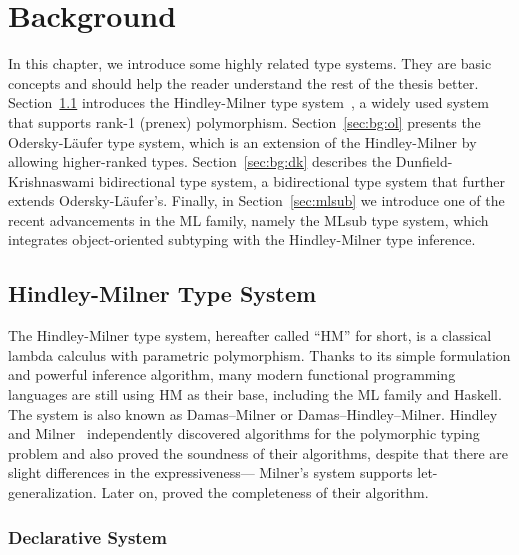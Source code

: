 \chapter{Background}
\label{chap:Background}

In this chapter, we introduce some highly related type systems.
They are basic concepts and should help the reader
understand the rest of the thesis better.
Section~\ref{sec:bg:hm} introduces the
Hindley-Milner type system~\citep{hindley1969principal,
milner1978theory,damas1982principal},
a widely used system that supports rank-1 (prenex) polymorphism.
Section~\ref{sec:bg:ol} presents the Odersky-L\"aufer type system,
which is an extension of the Hindley-Milner by allowing higher-ranked types.
Section~\ref{sec:bg:dk} describes the Dunfield-Krishnaswami
bidirectional type system,
a bidirectional type system that further extends Odersky-L\"aufer's.
Finally, in Section~\ref{sec:mlsub} we introduce
one of the recent advancements in the ML family,
namely the MLsub type system,
which integrates object-oriented subtyping with the Hindley-Milner type inference.


\section{Hindley-Milner Type System}\label{sec:bg:hm}

The Hindley-Milner type system, hereafter called ``HM'' for short,
is a classical lambda calculus with parametric polymorphism.
Thanks to its simple formulation and powerful inference algorithm,
many modern functional programming languages are still using HM as their base,
including the ML family and Haskell.
The system is also known as Damas–Milner or Damas–Hindley–Milner.
Hindley~\citep{hindley1969principal} and Milner~\citep{milner1978theory}
independently discovered algorithms for the polymorphic typing problem
and also proved the soundness of their algorithms,
despite that there are slight differences in the expressiveness---
Milner's system supports let-generalization.
Later on, \citet{damas1982principal} proved the completeness of their
algorithm.

\subsection{Declarative System}

